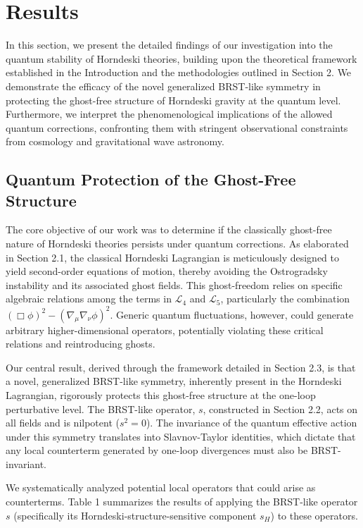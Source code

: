 \documentclass[twocolumn]{aastex631}
\begin{document}
\section{Results}
\label{sec:results}
In this section, we present the detailed findings of our investigation into the quantum stability of Horndeski theories, building upon the theoretical framework established in the Introduction and the methodologies outlined in Section 2. We demonstrate the efficacy of the novel generalized BRST-like symmetry in protecting the ghost-free structure of Horndeski gravity at the quantum level. Furthermore, we interpret the phenomenological implications of the allowed quantum corrections, confronting them with stringent observational constraints from cosmology and gravitational wave astronomy.

\subsection{Quantum Protection of the Ghost-Free Structure}
The core objective of our work was to determine if the classically ghost-free nature of Horndeski theories persists under quantum corrections. As elaborated in Section 2.1, the classical Horndeski Lagrangian is meticulously designed to yield second-order equations of motion, thereby avoiding the Ostrogradsky instability and its associated ghost fields. This ghost-freedom relies on specific algebraic relations among the terms in $\mathcal{L}_4$ and $\mathcal{L}_5$, particularly the combination $(\Box\phi)^2 - (\nabla_\mu\nabla_\nu\phi)^2$. Generic quantum fluctuations, however, could generate arbitrary higher-dimensional operators, potentially violating these critical relations and reintroducing ghosts.

Our central result, derived through the framework detailed in Section 2.3, is that a novel, generalized BRST-like symmetry, inherently present in the Horndeski Lagrangian, rigorously protects this ghost-free structure at the one-loop perturbative level. The BRST-like operator, $s$, constructed in Section 2.2, acts on all fields and is nilpotent ($s^2=0$). The invariance of the quantum effective action under this symmetry translates into Slavnov-Taylor identities, which dictate that any local counterterm generated by one-loop divergences must also be BRST-invariant.

We systematically analyzed potential local operators that could arise as counterterms. Table 1 summarizes the results of applying the BRST-like operator $s$ (specifically its Horndeski-structure-sensitive component $s_H$) to these operators.
\end{document}
